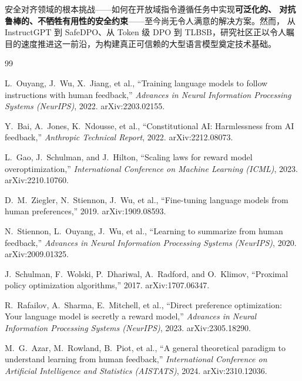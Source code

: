 \documentclass[12pt,a4paper,UTF8]{ctexart}
\begin{document}
安全对齐领域的根本挑战——如何在开放域指令遵循任务中实现\textbf{可泛化的、
对抗鲁棒的、不牺牲有用性的安全约束}——至今尚无令人满意的解决方案。然而，
从 InstructGPT 到 SafeDPO、从 Token 级 DPO 到 TLBSB，研究社区正以令人瞩
目的速度推进这一前沿，为构建真正可信赖的大型语言模型奠定技术基础。

\newpage

\begin{thebibliography}{99}

L.~Ouyang, J.~Wu, X.~Jiang, et al.,
``Training language models to follow instructions with human feedback,''
\textit{Advances in Neural Information Processing Systems (NeurIPS)},
2022. arXiv:2203.02155.

Y.~Bai, A.~Jones, K.~Ndousse, et al.,
``Constitutional AI: Harmlessness from AI feedback,''
\textit{Anthropic Technical Report},
2022. arXiv:2212.08073.

L.~Gao, J.~Schulman, and J.~Hilton,
``Scaling laws for reward model overoptimization,''
\textit{International Conference on Machine Learning (ICML)},
2023. arXiv:2210.10760.

D.~M.~Ziegler, N.~Stiennon, J.~Wu, et al.,
``Fine-tuning language models from human preferences,''
2019. arXiv:1909.08593.

N.~Stiennon, L.~Ouyang, J.~Wu, et al.,
``Learning to summarize from human feedback,''
\textit{Advances in Neural Information Processing Systems (NeurIPS)},
2020. arXiv:2009.01325.

J.~Schulman, F.~Wolski, P.~Dhariwal, A.~Radford, and O.~Klimov,
``Proximal policy optimization algorithms,''
2017. arXiv:1707.06347.

R.~Rafailov, A.~Sharma, E.~Mitchell, et al.,
``Direct preference optimization: Your language model is secretly a reward model,''
\textit{Advances in Neural Information Processing Systems (NeurIPS)},
2023. arXiv:2305.18290.

M.~G.~Azar, M.~Rowland, B.~Piot, et al.,
``A general theoretical paradigm to understand learning from human feedback,''
\textit{International Conference on Artificial Intelligence and Statistics (AISTATS)},
2024. arXiv:2310.12036.


\end{thebibliography}
\end{document}
